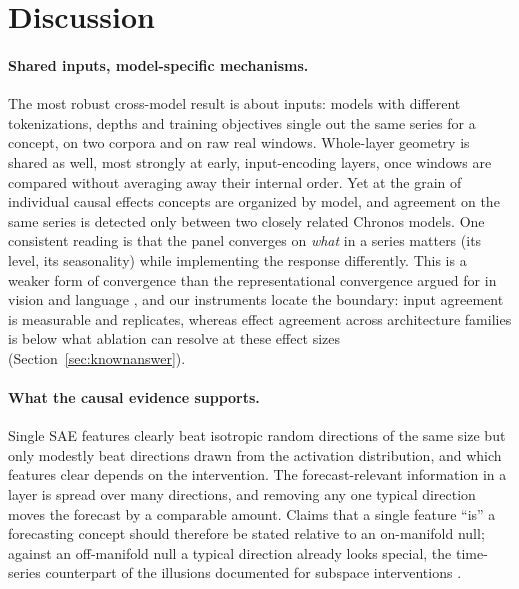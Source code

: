 \section{Discussion}
\label{sec:discussion}

\paragraph{Shared inputs, model-specific mechanisms.} The most robust cross-model result is about inputs: models with
different tokenizations, depths and training objectives single out the same series for a concept, on two corpora and on
raw real windows. Whole-layer geometry is shared as well, most strongly at early, input-encoding layers, once windows are
compared without averaging away their internal order. Yet at the grain of individual causal effects concepts are
organized by model, and agreement on the same series is detected only between two closely related Chronos models. One
consistent reading is that the panel converges on \emph{what} in a series matters (its level, its seasonality) while
implementing the response differently. This is a weaker form of convergence than the representational convergence argued
for in vision and language \citep{li2016convergent,huh2024platonic}, and our instruments locate the boundary: input
agreement is measurable and replicates, whereas effect agreement across architecture families is below what ablation can
resolve at these effect sizes (Section~\ref{sec:knownanswer}).

\paragraph{What the causal evidence supports.} Single SAE features clearly beat isotropic random directions of the same
size but only modestly beat directions drawn from the activation distribution, and which features clear depends on the
intervention. The forecast-relevant information in a layer is spread over many directions, and removing any one typical
direction moves the forecast by a comparable amount. Claims that a single feature ``is'' a forecasting concept should
therefore be stated relative to an on-manifold null; against an off-manifold null a typical direction already looks
special, the time-series counterpart of the illusions documented for subspace interventions \citep{makelov2024illusion}.

